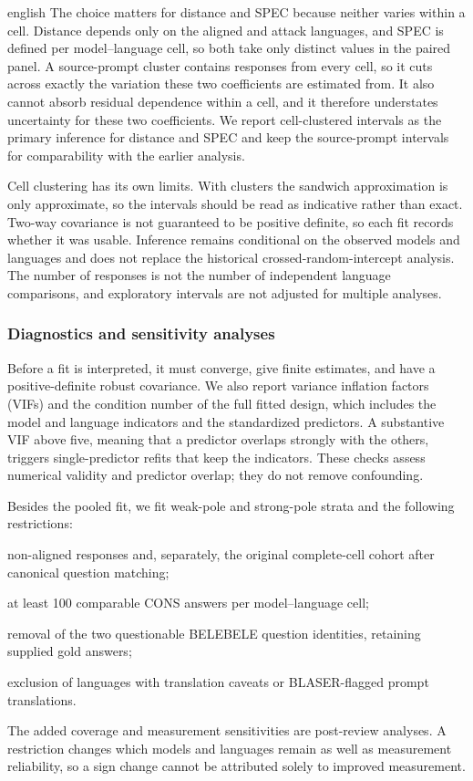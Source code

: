 \begin{otherlanguage*}{english}
The choice matters for distance and SPEC because neither varies within a cell. Distance depends only on the aligned and attack languages, and SPEC is defined per model--language cell, so both take only \RNumCells{} distinct values in the paired panel. A source-prompt cluster contains responses from every cell, so it cuts across exactly the variation these two coefficients are estimated from. It also cannot absorb residual dependence within a cell, and it therefore understates uncertainty for these two coefficients. We report cell-clustered intervals as the primary inference for distance and SPEC and keep the source-prompt intervals for comparability with the earlier analysis.

Cell clustering has its own limits. With \RNumCells{} clusters the sandwich approximation is only approximate, so the intervals should be read as indicative rather than exact. Two-way covariance is not guaranteed to be positive definite, so each fit records whether it was usable. Inference remains conditional on the observed models and languages and does not replace the historical crossed-random-intercept analysis. The number of responses is not the number of independent language comparisons, and exploratory intervals are not adjusted for multiple analyses.

\subsubsection{Diagnostics and sensitivity analyses}
Before a fit is interpreted, it must converge, give finite estimates, and have a positive-definite robust covariance. We also report variance inflation factors (VIFs) and the condition number of the full fitted design, which includes the model and language indicators and the standardized predictors. A substantive VIF above five, meaning that a predictor overlaps strongly with the others, triggers single-predictor refits that keep the indicators. These checks assess numerical validity and predictor overlap; they do not remove confounding.

Besides the pooled fit, we fit weak-pole and strong-pole strata and the following restrictions:
\begin{alineas}
    \item non-aligned responses and, separately, the original complete-cell cohort after canonical question matching;
    \item at least 100 comparable CONS answers per model--language cell;
    \item removal of the two questionable BELEBELE question identities, retaining supplied gold answers;
    \item exclusion of languages with translation caveats or BLASER-flagged prompt translations.
\end{alineas}
The added coverage and measurement sensitivities are post-review analyses. A restriction changes which models and languages remain as well as measurement reliability, so a sign change cannot be attributed solely to improved measurement.


\end{otherlanguage*}
